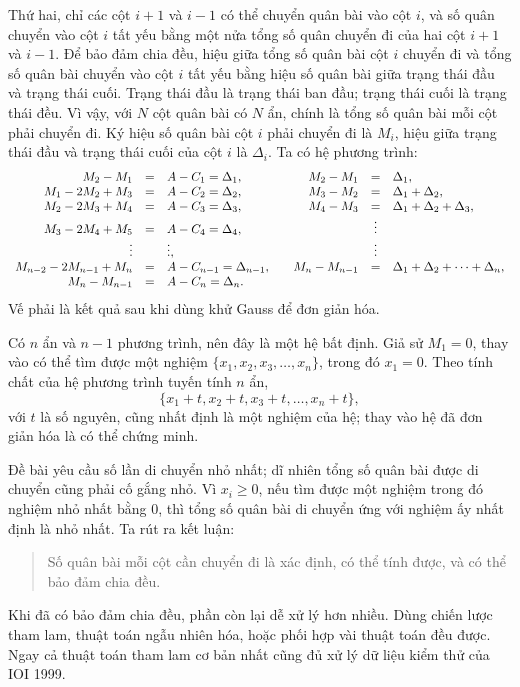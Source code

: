 \documentclass[11pt]{article}
\begin{document}
Thứ hai, chỉ các cột \(i+1\) và \(i-1\) có thể chuyển quân bài vào cột \(i\),
và số quân chuyển vào cột \(i\) tất yếu bằng một nửa tổng số quân chuyển đi
của hai cột \(i+1\) và \(i-1\). Để bảo đảm chia đều, hiệu giữa tổng số quân
bài cột \(i\) chuyển đi và tổng số quân bài chuyển vào cột \(i\) tất yếu bằng
hiệu số quân bài giữa trạng thái đầu và trạng thái cuối. Trạng thái đầu là
trạng thái ban đầu; trạng thái cuối là trạng thái đều. Vì vậy, với \(N\) cột
quân bài có \(N\) ẩn, chính là tổng số quân bài mỗi cột phải chuyển đi. Ký
hiệu số quân bài cột \(i\) phải chuyển đi là \(M_i\), hiệu giữa trạng thái đầu
và trạng thái cuối của cột \(i\) là \(\Delta_i\). Ta có hệ phương trình:
\[
\begin{array}{rcl@{\qquad}rcl}
M_2-M_1&=&A-C_1=\Delta_1, & M_2-M_1&=&\Delta_1,\\
M_1-2M_2+M_3&=&A-C_2=\Delta_2, & M_3-M_2&=&\Delta_1+\Delta_2,\\
M_2-2M_3+M_4&=&A-C_3=\Delta_3, & M_4-M_3&=&\Delta_1+\Delta_2+\Delta_3,\\
M_3-2M_4+M_5&=&A-C_4=\Delta_4, & &\vdots&\\
\vdots&&\vdots, & &\vdots&\\
M_{n-2}-2M_{n-1}+M_n&=&A-C_{n-1}=\Delta_{n-1},&
M_n-M_{n-1}&=&\Delta_1+\Delta_2+\cdots+\Delta_n,\\
M_n-M_{n-1}&=&A-C_n=\Delta_n.&&&
\end{array}
\]
Vế phải là kết quả sau khi dùng khử Gauss để đơn giản hóa.

Có \(n\) ẩn và \(n-1\) phương trình, nên đây là một hệ bất định. Giả sử
\(M_1=0\), thay vào có thể tìm được một nghiệm
\(\{x_1,x_2,x_3,\ldots,x_n\}\), trong đó \(x_1=0\). Theo tính chất của hệ
phương trình tuyến tính \(n\) ẩn,
\[
  \{x_1+t,x_2+t,x_3+t,\ldots,x_n+t\},
\]
với \(t\) là số nguyên, cũng nhất định là một nghiệm của hệ; thay vào hệ đã
đơn giản hóa là có thể chứng minh.

Đề bài yêu cầu số lần di chuyển nhỏ nhất; dĩ nhiên tổng số quân bài được di
chuyển cũng phải cố gắng nhỏ. Vì \(x_i\ge0\), nếu tìm được một nghiệm trong
đó nghiệm nhỏ nhất bằng 0, thì tổng số quân bài di chuyển ứng với nghiệm ấy
nhất định là nhỏ nhất. Ta rút ra kết luận:
\begin{quote}
Số quân bài mỗi cột cần chuyển đi là xác định, có thể tính được, và có thể
bảo đảm chia đều.
\end{quote}

Khi đã có bảo đảm chia đều, phần còn lại dễ xử lý hơn nhiều. Dùng chiến lược
tham lam, thuật toán ngẫu nhiên hóa, hoặc phối hợp vài thuật toán đều được.
Ngay cả thuật toán tham lam cơ bản nhất cũng đủ xử lý dữ liệu kiểm thử của
IOI 1999.
\end{document}
